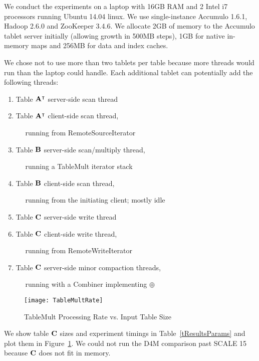 We conduct the experiments on a laptop with 16GB RAM and 2 Intel i7 processors %
running Ubuntu 14.04 linux. We use single-instance Accumulo 1.6.1, Hadoop 2.6.0 and ZooKeeper 3.4.6.
We allocate 2GB of memory to the Accumulo tablet server initially
(allowing growth in 500MB steps),
1GB for native in-memory maps and 256MB for data and index caches.


We chose not to use more than two tablets per table because more threads would run
than the laptop could handle.  Each additional tablet can potentially add the following threads:
\begin{enumerate}
\item Table $\mathbf{A}^{\intercal}$ server-side scan thread
\item Table $\mathbf{A}^{\intercal}$ client-side scan thread,

$\quad$ running from RemoteSourceIterator
\item Table $\mathbf{B}$ server-side scan/multiply thread,

$\quad$ running a TableMult iterator stack
\item Table $\mathbf{B}$ client-side scan thread, 

$\quad$ running from the initiating client; mostly idle
\item Table $\mathbf{C}$ server-side write thread
\item Table $\mathbf{C}$ client-side write thread,

$\quad$ running from RemoteWriteIterator
\item Table $\mathbf{C}$ server-side minor compaction threads,

$\quad$ running with a Combiner implementing $\oplus$
\end{enumerate}

\begin{figure}[tbh]
\centering
\texttt{[image: TableMultRate]}
\caption{TableMult Processing Rate vs. Input Table Size}
\label{fTableMultPerf}
\vspace{-4pt}
\end{figure}

We show table $\mathbf{C}$ sizes and experiment timings in Table~\ref{tResultsParams}
and plot them in Figure~\ref{fTableMultPerf}.
We could not run the D4M comparison past SCALE 15 because $\mathbf{C}$ does not fit in memory.

